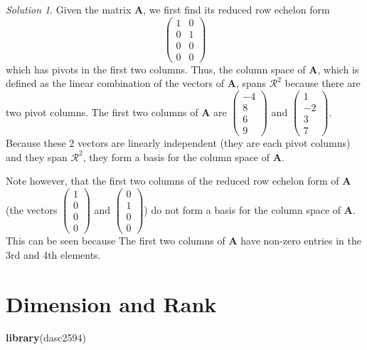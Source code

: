 \documentclass[
]{book}
\newenvironment{Shaded}{\begin{snugshade}}{\end{snugshade}}
\newcommand{\KeywordTok}[1]{\textcolor[rgb]{0.13,0.29,0.53}{\textbf{#1}}}
\newcommand{\NormalTok}[1]{#1}
\theoremstyle{definition}
\theoremstyle{definition}
\theoremstyle{definition}
\theoremstyle{definition}
\theoremstyle{remark}
\newtheorem*{solution}{Solution}
\begin{document}
\begin{solution}
Given the matrix \(\mathbf{A}\), we first find its reduced row echelon form
\[
\begin{pmatrix} 1 & 0 \\ 0 & 1 \\ 0 & 0 \\ 0 & 0 \end{pmatrix}
\]
which has pivots in the first two columns. Thus, the column space of \(\mathbf{A}\), which is defined as the linear combination of the vectors of \(\mathbf{A}\), spans \(\mathcal{R}^2\) because there are two pivot columns. The first two columns of \(\mathbf{A}\) are \(\begin{pmatrix} -4 \\ 8 \\ 6 \\ 9 \end{pmatrix}\) and \(\begin{pmatrix} 1 \\ -2 \\ 3 \\ 7 \end{pmatrix}\). Because these 2 vectors are linearly independent (they are each pivot columns) and they span \(\mathcal{R}^2\), they form a basis for the column space of \(\mathbf{A}\).

Note however, that the first two columns of the reduced row echelon form of \(\mathbf{A}\) (the vectors \(\begin{pmatrix} 1 \\ 0 \\ 0 \\ 0 \end{pmatrix}\) and \(\begin{pmatrix} 0 \\ 1 \\ 0 \\ 0 \end{pmatrix}\)) do not form a basis for the column space of \(\mathbf{A}\). This can be seen because The first two columns of \(\mathbf{A}\) have non-zero entries in the 3rd and 4th elements.
\end{solution}

\hypertarget{dimension-and-rank}{%
\chapter{Dimension and Rank}\label{dimension-and-rank}}

\begin{Shaded}
\begin{Highlighting}[]
\KeywordTok{library}\NormalTok{(dasc2594)}
\end{Highlighting}
\end{Shaded}
\end{document}
